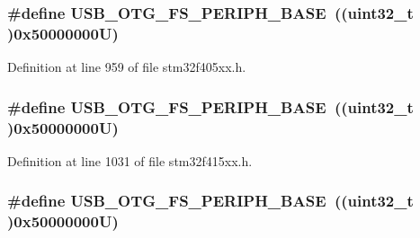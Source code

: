 \subsubsection[{\texorpdfstring{U\+S\+B\+\_\+\+O\+T\+G\+\_\+\+F\+S\+\_\+\+P\+E\+R\+I\+P\+H\+\_\+\+B\+A\+SE}{USB_OTG_FS_PERIPH_BASE}}]{\setlength{\rightskip}{0pt plus 5cm}\#define U\+S\+B\+\_\+\+O\+T\+G\+\_\+\+F\+S\+\_\+\+P\+E\+R\+I\+P\+H\+\_\+\+B\+A\+SE~((uint32\+\_\+t )0x50000000\+U)}\hypertarget{group___peripheral__registers__structures_gaa86d4c80849a74938924e73937b904e7}{}\label{group___peripheral__registers__structures_gaa86d4c80849a74938924e73937b904e7}


Definition at line 959 of file stm32f405xx.\+h.

\subsubsection[{\texorpdfstring{U\+S\+B\+\_\+\+O\+T\+G\+\_\+\+F\+S\+\_\+\+P\+E\+R\+I\+P\+H\+\_\+\+B\+A\+SE}{USB_OTG_FS_PERIPH_BASE}}]{\setlength{\rightskip}{0pt plus 5cm}\#define U\+S\+B\+\_\+\+O\+T\+G\+\_\+\+F\+S\+\_\+\+P\+E\+R\+I\+P\+H\+\_\+\+B\+A\+SE~((uint32\+\_\+t )0x50000000\+U)}\hypertarget{group___peripheral__registers__structures_gaa86d4c80849a74938924e73937b904e7}{}\label{group___peripheral__registers__structures_gaa86d4c80849a74938924e73937b904e7}


Definition at line 1031 of file stm32f415xx.\+h.

\subsubsection[{\texorpdfstring{U\+S\+B\+\_\+\+O\+T\+G\+\_\+\+F\+S\+\_\+\+P\+E\+R\+I\+P\+H\+\_\+\+B\+A\+SE}{USB_OTG_FS_PERIPH_BASE}}]{\setlength{\rightskip}{0pt plus 5cm}\#define U\+S\+B\+\_\+\+O\+T\+G\+\_\+\+F\+S\+\_\+\+P\+E\+R\+I\+P\+H\+\_\+\+B\+A\+SE~((uint32\+\_\+t )0x50000000\+U)}\hypertarget{group___peripheral__registers__structures_gaa86d4c80849a74938924e73937b904e7}{}\label{group___peripheral__registers__structures_gaa86d4c80849a74938924e73937b904e7}


